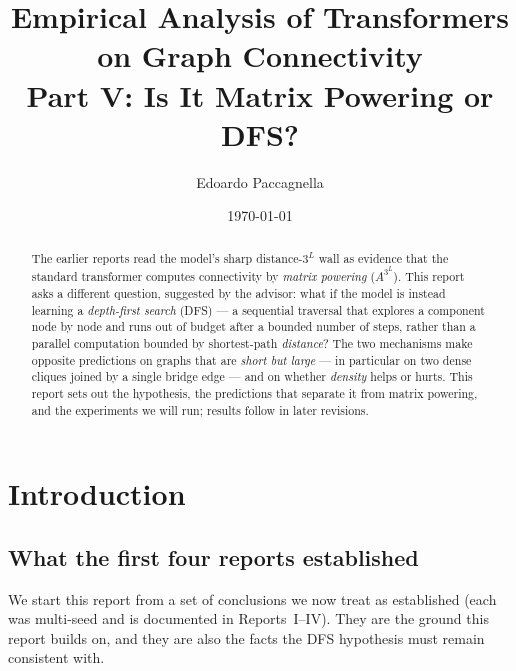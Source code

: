 \documentclass[11pt,a4paper]{article}
\title{Empirical Analysis of Transformers on Graph Connectivity \\
       \large Part V: Is It Matrix Powering or DFS?}
\author{Edoardo Paccagnella}
\date{\today}
\begin{document}
\maketitle

\begin{abstract}
\noindent The earlier reports read the model's sharp distance-$3^L$ wall as evidence that
the standard transformer computes connectivity by \emph{matrix powering} ($A^{3^L}$). This
report asks a different question, suggested by the advisor: what if the model is instead
learning a \emph{depth-first search} (DFS) --- a sequential traversal that explores a
component node by node and runs out of budget after a bounded number of steps, rather than a
parallel computation bounded by shortest-path \emph{distance}? The two mechanisms make
opposite predictions on graphs that are \emph{short but large} --- in particular on two dense
cliques joined by a single bridge edge --- and on whether \emph{density} helps or hurts. This
report sets out the hypothesis, the predictions that separate it from matrix powering, and the
experiments we will run; results follow in later revisions.
\end{abstract}

\section{Introduction}
\label{sec:intro}

\subsection{What the first four reports established}
\label{sec:recap}

We start this report from a set of conclusions we now treat as established (each was
multi-seed and is documented in Reports~I--IV). They are the ground this report builds on, and
they are also the facts the DFS hypothesis must remain consistent with.
\end{document}
